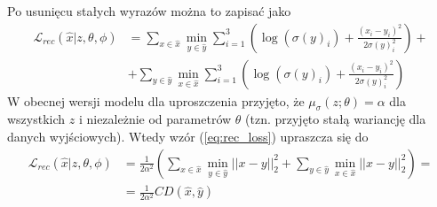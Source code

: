 \documentclass[12pt]{extarticle}
\begin{document}
Po usunięcu stałych wyrazów można to zapisać jako
\begin{equation}
\begin{split}
\mathcal{L}_{rec}(\hat{x}|z,\theta,\phi) &= \sum_{x \in \hat{x}} \min_{y \in \hat{y}} \sum_{i=1}^3
\left( \log(\sigma(y)_i) + \frac{(x_i-y_i)^2}{2\sigma(y)_i^2} \right) +\\
&+ \sum_{y \in \hat{y}} \min_{x \in \hat{x}} \sum_{i=1}^3
\left( \log(\sigma(y)_i) + \frac{(x_i-y_i)^2}{2\sigma(y)_i^2} \right)
\end{split}
\label{eq:rec_loss}
\end{equation}
W obecnej wersji modelu dla uproszczenia przyjęto, że $\mu_\sigma(z;\theta) = \alpha$
dla wszystkich $z$ i niezależnie od parametrów $\theta$ (tzn. przyjęto stałą wariancję dla
danych wyjściowych). Wtedy wzór (\ref{eq:rec_loss}) upraszcza się do
\begin{equation}
\begin{split}
\mathcal{L}_{rec}(\hat{x}|z,\theta,\phi) &= \frac{1}{2\alpha^2} \left(
\sum_{x \in \hat{x}} \min_{y \in \hat{y}} ||x-y||_2^2 +
\sum_{y \in \hat{y}} \min_{x \in \hat{x}} ||x-y||_2^2 \right) = \\
&= \frac{1}{2\alpha^2} CD(\hat{x}, \hat{y})
\end{split}
\end{equation}




\end{document}
